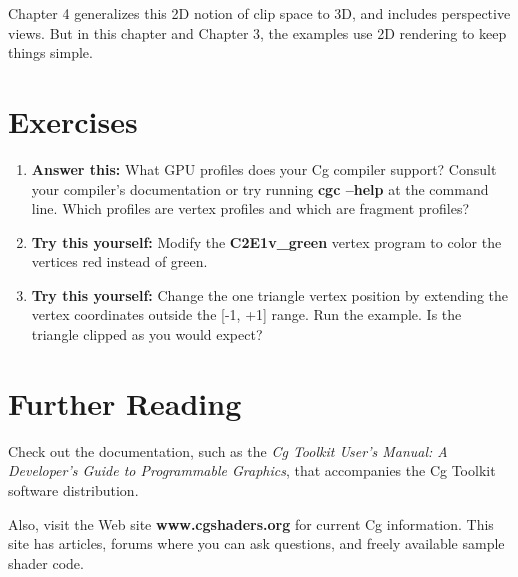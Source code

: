 \documentclass{book}
\begin{document}
Chapter 4 generalizes this 2D notion of clip space to 3D, and includes perspective views. But in this chapter and Chapter 3, the examples use 2D rendering to keep things simple.

\section{Exercises}

\FloatBarrier
\begin{enumerate}
\item \textbf{Answer this:} What GPU profiles does your Cg compiler support? Consult your compiler's documentation or try running \textbf{cgc –help} at the command line. Which profiles are vertex profiles and which are fragment profiles?
\item \textbf{Try this yourself:} Modify the \textbf{C2E1v\_green} vertex program to color the vertices red instead of green.
\item \textbf{Try this yourself:} Change the one triangle vertex position by extending the vertex coordinates outside the [-1, +1] range. Run the example. Is the triangle clipped as you would expect?
\end{enumerate}
\FloatBarrier

\section{Further Reading}

Check out the documentation, such as the \textit{Cg Toolkit User's Manual: A Developer's Guide to Programmable Graphics}, that accompanies the Cg Toolkit software distribution.

Also, visit the Web site \textbf{www.cgshaders.org} for current Cg information. This site has articles, forums where you can ask questions, and freely available sample shader code.
\end{document}
